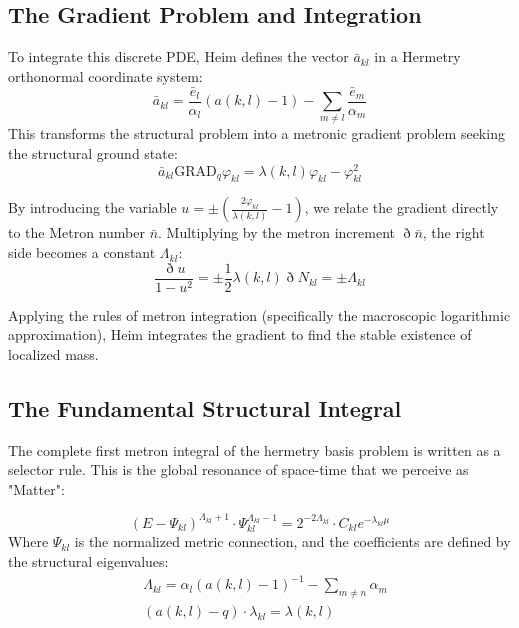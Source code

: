 \documentclass[11pt,a4paper,oneside]{article}
\newcommand{\ethop}{\eth}
\begin{document}
\subsection{The Gradient Problem and Integration}

To integrate this discrete PDE, Heim defines the vector $\bar{a}_{kl}$ in a Hermetry orthonormal coordinate system:
\begin{equation*}
    \bar{a}_{kl} = \frac{\bar{e}_l}{\alpha_l}(a(k,l)-1) - \sum_{m \neq l} \frac{\bar{e}_m}{\alpha_m}
\end{equation*}
This transforms the structural problem into a metronic gradient problem seeking the structural ground state:
\begin{equation*}
    \bar{a}_{kl} \mathrm{GRAD}_q \varphi_{kl} = \lambda(k,l)\varphi_{kl} - \varphi_{kl}^2
\end{equation*}

By introducing the variable $u = \pm (\frac{2\varphi_{kl}}{\lambda(k, l)} - 1)$, we relate the gradient directly to the Metron number $\bar{n}$. Multiplying by the metron increment $\ethop \bar{n}$, the right side becomes a constant $\Lambda_{kl}$:
\begin{equation}
    \frac{\ethop u}{1 - u^2} = \pm \frac{1}{2} \lambda(k, l) \ethop N_{kl} = \pm \Lambda_{kl}
\tag{W4}
\end{equation}

Applying the rules of metron integration (specifically the macroscopic logarithmic approximation), Heim integrates the gradient to find the stable existence of localized mass.

\subsection{The Fundamental Structural Integral}

The complete first metron integral of the hermetry basis problem is written as a selector rule. This is the global resonance of space-time that we perceive as "Matter":

\begin{tcolorbox}[colback=white, colframe=theoryred, title=\textbf{The First Integral of the World Structure}]
\begin{equation}
    (E - \Psi_{kl})^{\Lambda_{kl} + 1} \cdot \Psi_{kl}^{\Lambda_{kl} - 1} = 2^{-2\Lambda_{kl}} \cdot C_{kl} e^{-\lambda_{kl} \mu} \tag{W5}
\end{equation}
Where $\Psi_{kl}$ is the normalized metric connection, and the coefficients are defined by the structural eigenvalues:
\begin{equation*}
\begin{split}
    &\Lambda_{kl} = \alpha_l (a(k, l) - 1)^{-1} - \sum_{m \neq n} \alpha_m \\
    &(a(k, l) - q) \cdot \lambda_{kl} = \lambda(k, l)
\end{split}
\end{equation*}
\end{tcolorbox}
\end{document}

